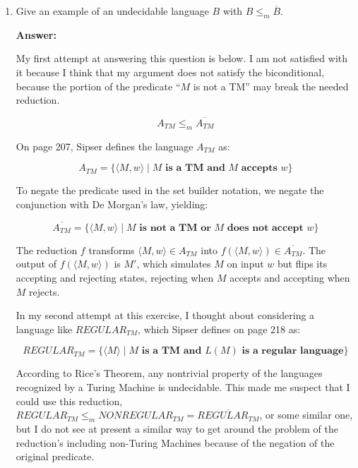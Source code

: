 \documentclass[11pt]{article}
\begin{document}
\begin{enumerate}[label=\textbf{Exercise \arabic{*}}]
  \item Give an example of an undecidable language $B$ with $B \le_m \overline{B}$.
        \medskip

        \textbf{Answer:}

        My first attempt at answering this question is below. I am not satisfied with it because I think that my argument does not satisfy the biconditional, because the portion of the predicate ``$M$ is not a TM'' may break the needed reduction.

        \[
          A_{TM} \le_m \overline{A_{TM}}
        \]

        On page 207, Sipser defines the language $A_{TM}$ as:

        \[
          A_{TM} = \{\langle M, w \rangle \mid \textbf{$M$ is a TM and $M$ accepts $w$}\}
        \]

        To negate the predicate used in the set builder notation, we negate the conjunction with De Morgan's law, yielding:

        \[
          \overline{A_{TM}} = \{\langle M, w \rangle \mid \textbf{$M$ is not a TM or $M$ does not accept $w$}\}
        \]

        The reduction $f$ transforms $\langle M, w \rangle \in A_{TM}$ into $f(\langle M, w \rangle) \in \overline{A_{TM}}$. The output of $f(\langle M, w \rangle)$ is $M'$, which simulates $M$ on input $w$ but flips its accepting and rejecting states, rejecting when $M$ accepts and accepting when $M$ rejects.

        In my second attempt at this exercise, I thought about considering a language like $REGULAR_{TM}$, which Sipser defines on page 218 as:

        \[
        REGULAR_{TM} = \{\langle M \rangle \mid \textbf{$M$ is a TM and $L(M)$ is a regular language}\}
        \]

        According to Rice's Theorem, any nontrivial property of the languages recognized by a Turing Machine is undecidable. This made me suspect that I could use this reduction, $REGULAR_{TM} \le_m NONREGULAR_{TM} = \overline{REGULAR_{TM}}$, or some similar one, but I do not see at present a similar way to get around the problem of the reduction's including non-Turing Machines because of the negation of the original predicate.

\end{enumerate}
\end{document}

